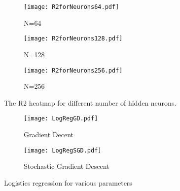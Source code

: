 \documentclass[10pt]{article}
\begin{document}
	\begin{figure}
	\centering
			
	\begin{subfigure}[b]{0.9\textwidth}  
		\centering 
		\texttt{[image: R2forNeurons64.pdf]}
		\caption[]%
		{{\small N=64}}    
		\label{fig:mean and std of net24}
	\end{subfigure}
	\hfill
	\begin{subfigure}[b]{0.9\textwidth}   
		\centering 
		\texttt{[image: R2forNeurons128.pdf]}
		\caption[]%
		{{\small N=128}}    
		\label{fig:mean and std of net34}
	\end{subfigure}
	\quad
	\begin{subfigure}[b]{0.9\textwidth}   
		\centering 
		\texttt{[image: R2forNeurons256.pdf]}
		\caption[]%
		{{\small N=256}}    
		\label{fig:mean and std of net44}
	\end{subfigure}
	\caption[ The average and standard deviation of critical parameters ]
	{\small The R2 heatmap for different number of hidden neurons.} 
	\label{fig:R2NN2}
\end{figure}


	\begin{figure}
	\centering
	\begin{subfigure}[b]{1.0\textwidth}  
		\centering 
		\texttt{[image: LogRegGD.pdf]}
		\caption[]%
		{{\small Gradient Decent}}    
		\label{fig:LogRegGD}
	\end{subfigure}
	\hfill
	\begin{subfigure}[b]{1.0\textwidth}   
		\centering 
		\texttt{[image: LogRegSGD.pdf]}
		\caption[]%
		{{\small Stochastic Gradient Descent}}    
		\label{fig:LogRegS}
	\end{subfigure}
	\quad
	\caption[ The average and standard deviation of critical parameters ]
	{\small Logistics regression for various parameters} 
	\label{fig:LogReg}
\end{figure}
\end{document}
